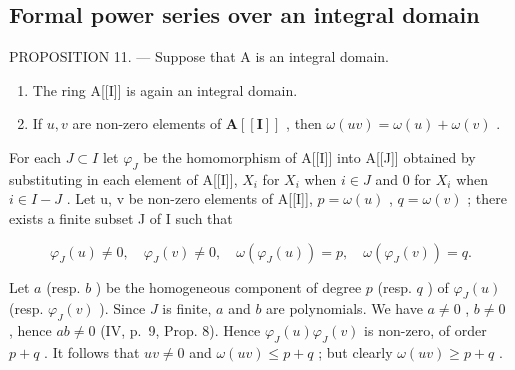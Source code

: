 \subsection{Formal power series over an integral domain}

PROPOSITION 11. --- Suppose that A is an integral domain.

\begin{enumerate}
\def\labelenumi{(\roman{enumi})}
\item
  The ring A{[}{[}I{]}{]} is again an integral domain.
\item
  If \(u, v\) are non-zero elements of \(\mathbf{A}[[\mathbf{I}]]\) , then \(\omega(uv) = \omega(u) + \omega(v)\) .
\end{enumerate}

For each \(J \subset I\) let \(\varphi_{J}\) be the homomorphism of A{[}{[}I{]}{]} into A{[}{[}J{]}{]} obtained by substituting in each element of A{[}{[}I{]}{]}, \(X_{i}\) for \(X_{i}\) when \(i \in J\) and 0 for \(X_{i}\) when \(i \in I - J\) . Let u, v be non-zero elements of A{[}{[}I{]}{]}, \(p = \omega(u)\) , \(q = \omega(v)\) ; there exists a finite subset J of I such that

\[
\varphi_ {J} (u) \neq 0, \quad \varphi_ {J} (v) \neq 0, \quad \omega (\varphi_ {J} (u)) = p, \quad \omega (\varphi_ {J} (v)) = q.
\]

Let \(a\) (resp. \(b\) ) be the homogeneous component of degree \(p\) (resp. \(q\) ) of \(\varphi_{J}(u)\) (resp. \(\varphi_{J}(v)\) ). Since \(J\) is finite, \(a\) and \(b\) are polynomials. We have \(a \neq 0\) , \(b \neq 0\) , hence \(ab \neq 0\) (IV, p.~9, Prop. 8). Hence \(\varphi_{J}(u) \varphi_{J}(v)\) is non-zero, of order \(p + q\) . It follows that \(uv \neq 0\) and \(\omega(uv) \leqslant p + q\) ; but clearly \(\omega(uv) \geqslant p + q\) .

